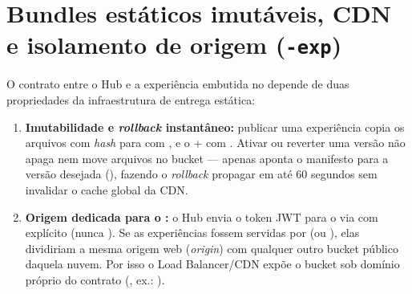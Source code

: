 \section{Bundles estáticos imutáveis, CDN e isolamento de origem (\texttt{-exp})}

O contrato entre o Hub e a experiência embutida no  depende de duas
propriedades da infraestrutura de entrega estática:

\begin{enumerate}
  \item \textbf{Imutabilidade e \emph{rollback} instantâneo:} publicar uma
    experiência copia os arquivos com \emph{hash} para
     com , e o  + 
    com . Ativar ou reverter uma versão
    não apaga nem move arquivos no bucket --- apenas aponta o manifesto para a
    versão desejada (), fazendo o \emph{rollback}
    propagar em até 60 segundos sem invalidar o cache global da CDN.
  \item \textbf{Origem dedicada para o :} o Hub envia o token
    JWT para o  via  com 
    explícito (nunca \cd{*}). Se as experiências fossem servidas por
     (ou ),
    elas dividiriam a mesma origem web (\emph{origin}) com qualquer outro bucket
    público daquela nuvem. Por isso o Load Balancer/CDN expõe o bucket sob
    domínio próprio do contrato (, ex.:
    ).
\end{enumerate}

